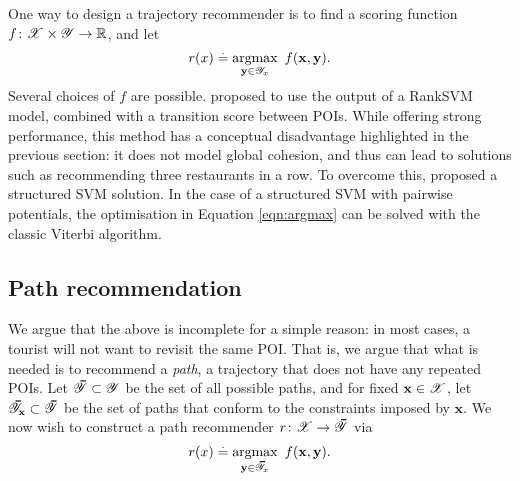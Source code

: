 One way to design a trajectory recommender is to find a scoring function $f \colon \mathscr{X} \times \mathscr{Y} \to \mathbb{R}$, and let
\begin{equation}
	\label{eqn:argmax}
	r( x ) \stackrel{.}{=} \operatorname*{argmax}_{\mathbf{y} \in \mathscr{Y}_x}~f(\mathbf{x}, \mathbf{y}).
\end{equation}
Several choices of $f$ are possible.
\citet{cikm16paper} proposed to use the output of a RankSVM model, combined with a transition score between POIs.
While offering strong performance, this method has a conceptual disadvantage highlighted in the previous section:
it does not model global cohesion, and thus can lead to solutions such as recommending three restaurants in a row.
To overcome this, \citet{Chen:2017} proposed a structured SVM solution.
In the case of a structured SVM with pairwise potentials, the optimisation in Equation \ref{eqn:argmax} can be solved with the classic Viterbi algorithm.


%
\subsection{Path recommendation}

We argue that the above is incomplete for a simple reason:
in most cases, a tourist will not want to revisit the same POI.
That is, we argue that what is needed is to recommend a \emph{path}, \ie a trajectory that does not have any repeated POIs.
Let $\thickbar{\YCal} \subset \YCal$ be the set of all possible paths,
and for fixed $\mathbf{x} \in \mathscr{X}$, let $\thickbar{\YCal}_{\x} \subset \thickbar{\YCal}$ be the set of paths that conform to the constraints imposed by $\mathbf{x}$.
We now wish to construct a path recommender $r \colon \XCal \to \thickbar{\YCal}$ via
\begin{equation}
	\label{eqn:argmax-path}
	r( x ) \defEq \argmax_{\mathbf{y} \in \thickbar{\YCal}_x}~f(\mathbf{x}, \mathbf{y}).
\end{equation}

